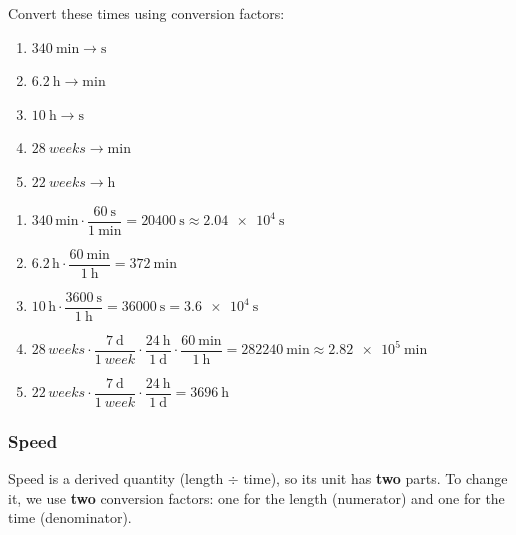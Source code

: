 \begin{exercise}
    Convert these times using conversion factors:
    \begin{enumerate}[label=\letraminuscula]
        \item \(\qty{340}{\minute} \to \unit{\s}\)
        \item \(\qty{6.2}{\hour} \to \unit{\minute}\)
        \item \(\qty{10}{\hour} \to \unit{\s}\)
        \item \(\qty{28}{weeks} \to \unit{\minute}\)
        \item \(\qty{22}{weeks} \to \unit{\hour}\)
    \end{enumerate}
    \begin{solu}
        \begin{enumerate}[label=\alph*)]
            \item \(\num{340}\,\unit{\minute} \cdot \dfrac{\qty{60}{\s}}{\qty{1}{\minute}} = \qty{20400}{\s} \approx \qty{2.04e4}{\s}\)
            \item \(\num{6.2}\,\unit{\hour} \cdot \dfrac{\qty{60}{\minute}}{\qty{1}{\hour}} = \qty{372}{\minute}\)
            \item \(\num{10}\,\unit{\hour} \cdot \dfrac{\qty{3600}{\s}}{\qty{1}{\hour}} = \qty{36000}{\s} = \qty{3.6e4}{\s}\)
            \item \(\num{28}\,\unit{weeks} \cdot \dfrac{\qty{7}{\day}}{\qty{1}{week}} \cdot \dfrac{\qty{24}{\hour}}{\qty{1}{\day}} \cdot \dfrac{\qty{60}{\minute}}{\qty{1}{\hour}} = \qty{282240}{\minute} \approx \qty{2.82e5}{\minute}\)
            \item \(\num{22}\,\unit{weeks} \cdot \dfrac{\qty{7}{\day}}{\qty{1}{week}} \cdot \dfrac{\qty{24}{\hour}}{\qty{1}{\day}} = \qty{3696}{\hour}\)
        \end{enumerate}
    \end{solu}
\end{exercise}


\subsubsection{Speed}

Speed is a derived quantity (length \(\div\) time), so its unit has \textbf{two} parts. To change it, we use \textbf{two} conversion factors: one for the length (numerator) and one for the time (denominator).

